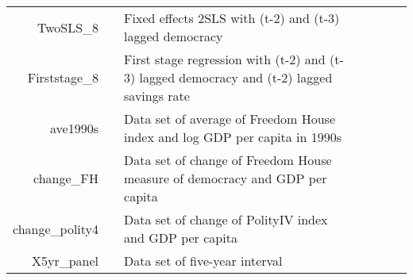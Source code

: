 \begin{tabular}{rp{0.2cm}lp{1cm}rp{0.2cm}l}
TwoSLS\_8  &&  Fixed effects 2SLS with (t-2) and (t-3) lagged democracy  && &&   \\   
Firststage\_8  &&  First stage regression with (t-2) and (t-3) lagged democracy and (t-2) lagged savings rate  && &&   \\       
ave1990s & & Data set of average of Freedom House index and log GDP per capita in 1990s  && &&   \\
change\_FH& &     Data set of change of Freedom House measure of democracy and GDP per capita   && &&   \\
change\_polity4  & & Data set of change of PolityI\hspace{-.1em}V index and GDP per capita  && &&   \\
X5yr\_panel &&  Data set of five-year interval   && &&   \\

\end{tabular}
